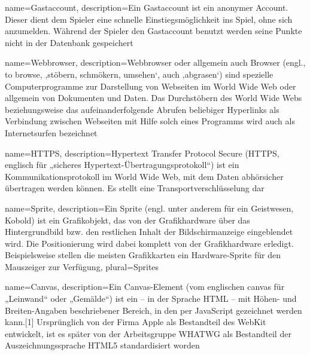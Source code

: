 

{
    name=Gastaccount,
    description={Ein Gastaccount ist ein anonymer Account. Dieser dient dem Spieler eine schnelle Einstiegsmöglichkeit ins Spiel, ohne sich anzumelden. Während der Spieler den Gastaccount benutzt werden seine Punkte nicht in der Datenbank gespeichert}
}

{
    name=Webbrowser,
    description={Webbrowser oder allgemein auch Browser (engl., to browse, ‚stöbern, schmökern, umsehen‘, auch ‚abgrasen‘) sind spezielle Computerprogramme zur Darstellung von Webseiten im World Wide Web oder allgemein von Dokumenten und Daten. Das Durchstöbern des World Wide Webs beziehungsweise das aufeinanderfolgende Abrufen beliebiger Hyperlinks als Verbindung zwischen Webseiten mit Hilfe solch eines Programms wird auch als Internetsurfen bezeichnet}
}

{
    name=HTTPS,
    description={Hypertext Transfer Protocol Secure (HTTPS, englisch für „sicheres Hypertext-Übertragungsprotokoll“) ist ein Kommunikationsprotokoll im World Wide Web, mit dem Daten abhörsicher übertragen werden können. Es stellt eine Transportverschlüsselung dar}
}

{
    name=Sprite,
    description={Ein Sprite (engl. unter anderem für ein Geistwesen, Kobold) ist ein Grafikobjekt, das von der Grafikhardware über das Hintergrundbild bzw. den restlichen Inhalt der Bildschirmanzeige eingeblendet wird. Die Positionierung wird dabei komplett von der Grafikhardware erledigt. Beispielsweise stellen die meisten Grafikkarten ein Hardware-Sprite für den Mauszeiger zur Verfügung},
    plural={Sprites}
}

{
    name=Canvas,
    description={Ein Canvas-Element (vom englischen canvas für „Leinwand“ oder „Gemälde“) ist ein – in der Sprache HTML – mit Höhen- und Breiten-Angaben beschriebener Bereich, in den per JavaScript gezeichnet werden kann.[1] Ursprünglich von der Firma Apple als Bestandteil des WebKit entwickelt, ist es später von der Arbeitsgruppe WHATWG als Bestandteil der Auszeichnungssprache HTML5 standardisiert worden}
}

